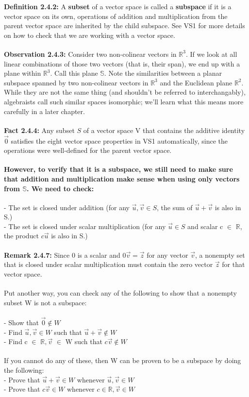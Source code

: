 \documentclass{article}
\begin{document}
{\textbf{Definition 2.4.2:} A \textbf{subset} of a vector space is called a \textbf{subspace} if it is a vector space on its own, operations of addition and multiplication from the parent vector space are inherited by the child subspace. See VS1 for more details on how to check that we are working with a vector space.\\
\\
\textbf{Observation 2.4.3:} Consider two non-colinear vectors in $\mathbb{R}^{3}$. If we look at all linear combinations of those two vectors (that is, their span), we end up with a plane within  $\mathbb{R}^{3}$. Call this plane $\mathbb{S}$. Note the similarities between a planar subspace spanned by two non-colinear vectors in  $\mathbb{R}^{3}$ and the Euclidean plane $\mathbb{R}^{2}$. While they are not the same thing (and shouldn't be referred to interchangably), algebraists call such similar spaces isomorphic; we'll learn what this means more carefully in a later chapter.\\
\\
\textbf{Fact 2.4.4:} Any subset ${S}$ of a vector space V that contains the additive identity $\vec{0}$ satisfies the eight vector space properties in VS1 automatically, since the operations were well-defined for the parent vector space.\\
\\
\textbf{However, to verify that it is a subspace, we still need to make sure that addition and multiplication make sense when using only vectors from $\mathbb{S}$. We need to check:}\\
\\
- The set is closed under addition (for any $\vec{u},\vec{v} \in {S}$, the sum of $\vec{u} + \vec{v}$ is also in S.)\\
- The set is closed under scalar multiplication (for any $\vec{u} \in {S}$ and scalar c $\in$ $\mathbb{R}$, the product $c\vec{u}$ is also in S.)\\
\\
\textbf{Remark 2.4.7:} Since 0 is a scalar and $0\vec{v}=\vec{z}$ for any vector $\vec{v}$, a nonempty set that is closed under scalar multiplication must contain the zero vector $\vec{z}$ for that vector space.\\
\\
Put another way, you can check any of the following to show that a nonempty subset W is not a subspace:\\
\\
- Show that $\vec{0} \notin W$\\
- Find $\vec{u}, \vec{v} \in W$ such that $\vec{u} + \vec{v} \notin W$\\
- Find c $\in$ $\mathbb{R},\vec{v}$ $\in$ W such that $c\vec{v} \notin W$\\
\\
If you cannot do any of these, then W can be proven to be a subspace by doing the following:\\
- Prove that $\vec{u} + \vec{v} \in W$ whenever  $\vec{u}, \vec{v} \in W$\\
- Prove that $c\vec{v} \in W$ whenever $c \in \mathbb{R}, \vec{v} \in W$\\
\\

}
\end{document}
